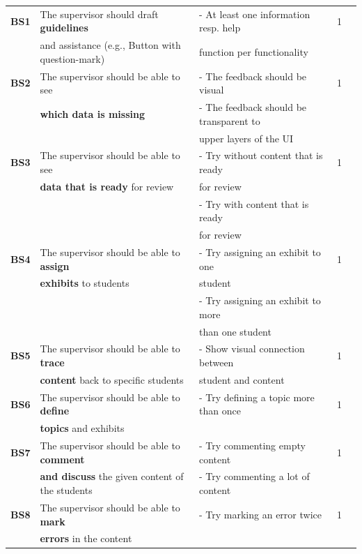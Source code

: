 {\begin{landscape}
\begin{center}
\begin{longtable}{|l|l|lll|}
\hline \hline
\endlastfoot
		\hline
	\textbf{BS1} 	& The supervisor should draft \textbf{guidelines} 		& - At least one information resp. help 	& 1	\\
	 		& and assistance (e.g., Button with question-mark)		& function per functionality 			& 		\\
	\hline
	\textbf{BS2} 	& The supervisor should be able to see 				&  - The feedback should be visual	& 1	\\
	 	& \textbf{which data is missing} 					&  - The feedback should be transparent to	& 	\\
		& 											& upper layers of the UI & \\
	\hline
	\textbf{BS3} 	& The supervisor should be able to see 				& - Try without content that is ready & 1\\
	 	& \textbf{data that is ready} for review 				&  for review & \\
		&											& - Try with content that is ready		& \\
		&											& for review		& \\
	\hline
	\textbf{BS4} 	& The supervisor should be able to \textbf{assign} 	& - Try assigning an exhibit to one & 1\\
	 	& \textbf{exhibits} to students 					& student  & \\
		&										& - Try assigning an exhibit to more	& \\
		&										&	than one student				& \\
	\hline
	\textbf{BS5} 	& The supervisor should be able to \textbf{trace} 		& - Show visual connection between	& 1\\
	 	& \textbf{content} back to specific students 			&  student and content 	& \\
	\hline
	\textbf{BS6} 	& The supervisor should be able to \textbf{define}  	&  - Try defining a topic more than once	& 1\\
	 	& \textbf{topics} and exhibits  				    		&  	& \\
	\hline
	\textbf{BS7} 	& The supervisor should be able to \textbf{comment} 		& - Try commenting empty content		& 1\\
		& \textbf{and discuss} the given content of the students 	&- Try commenting a lot of content		& \\	
	\hline
	\textbf{BS8} 	& The supervisor should be able to \textbf{mark} 	& - Try marking an error twice & 1\\
		& \textbf{errors} in the content					&	& \\

\end{longtable}
\end{center}
\end{landscape}}
